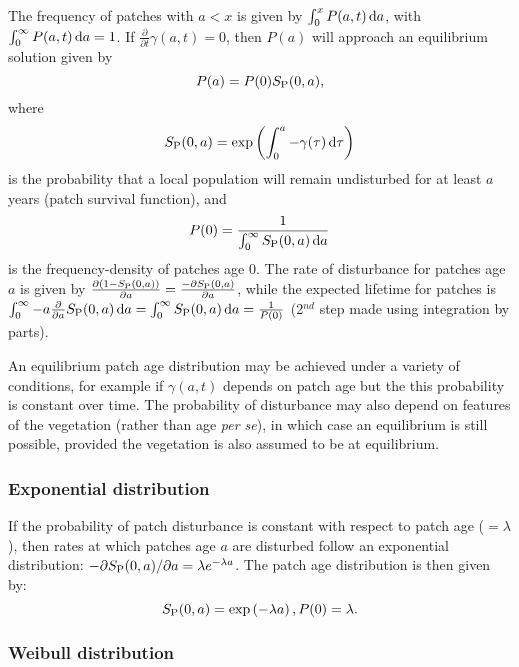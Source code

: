 \documentclass[10pt,twoside]{article}
\begin{document}
The frequency of patches with \(a < x\) is given by
\(\int_{0}^{x}P(a, t) \, {\rm d}a\), with
\(\int_{0}^{\infty} P(a, t) \, {\rm d}a = 1\). If
\(\frac{\partial}{\partial t}\gamma(a, t) = 0\), then \(P(a)\) will
approach an equilibrium solution given by \[P(a) = P(0) S_{\rm P}(0, a),\] where
\[S_{\rm P}(0, a) = \exp \left( \int_{0}^{a}-\gamma(\tau) \, {\rm d}\tau\right)\]
is the probability that a local population will remain undisturbed for
at least \(a\) years (patch survival function), and
\[P(0) = \frac1{ \int_{0}^{\infty}S_{\rm P}(0, a) \, {\rm d}a}\] is the
frequency-density of patches age 0. The rate of disturbance for patches
age \(a\) is given by
\(\frac{\partial (1-S_{\rm P}(0, a))}{\partial a} = \frac{-\partial S_{\rm P}(0, a)}{\partial a}\),
while the expected lifetime for patches is
\(\int_0^\infty - a \frac{\partial}{\partial a} S_{\rm P}(0, a) \, {\rm d} a = \int_0^\infty S_{\rm P}(0, a) \, {\rm d} a = \frac1{P(0)}\)
(2\(^{nd}\) step made using integration by parts).

An equilibrium patch age distribution may be achieved under a variety of
conditions, for example if \(\gamma(a, t)\) depends on patch age but the
this probability is constant over time. The probability of disturbance
may also depend on features of the vegetation (rather than age \emph{per
se}), in which case an equilibrium is still possible, provided the
vegetation is also assumed to be at equilibrium.

\subsubsection{Exponential distribution}\label{exponential-distribution}

If the probability of patch disturbance is constant with respect to
patch age (\( = \lambda\)), then rates at which patches age \(a\) are
disturbed follow an exponential distribution:
\(-\partial S_{\rm P}(0, a)/ \partial a = \lambda e^{-\lambda a}\). The patch age
distribution is then given by:
\[ S_{\rm P}(0, a) = \exp\left(-\lambda a\right), P(0) = \lambda.\]

\subsubsection{Weibull distribution}\label{weibull-distribution}
\end{document}
